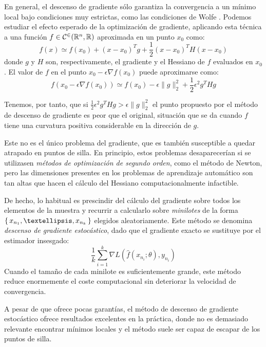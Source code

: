 En general, el descenso de gradiente sólo garantiza la convergencia a un mínimo local bajo condiciones muy estrictas, como las condiciones de Wolfe \cite{nocedal2006}. Podemos estudiar el efecto esperado de la optimización de gradiente, aplicando esta técnica a una función \( f \in \mathcal{C^2}(\mathbb{R}^{n}, \mathbb{R}) \) aproximada en un punto \( x_{0} \) como:
\[
    f(x) \simeq f(x_{0}) + (x - x_{0})^T g + \frac{1}{2} (x - x_{0})^T H (x-x_{0})
\]
donde \( g \) y \( H \) son, respectivamente, el gradiente y  el Hessiano de \( f \) evaluados en \( x_{0} \). El valor de \( f \) en el punto \( x_{0} - \epsilon \nabla f(x_0) \) puede aproximarse como:
\begin{equation}\label{eq:descent}
    f \left( x_{0} - \epsilon \nabla f(x_{0}) \right) \simeq f(x_{0}) - \epsilon \| g \|_2^2 +  \frac{1}{2} \epsilon^2 g^T Hg
\end{equation}

Tenemos, por tanto, que si \( \frac{1}{2} \epsilon^2 g^T Hg > \epsilon \| g \|_2^2 \) el punto propuesto por el método de descenso de gradiente es peor que el original, situación que se da cuando \( f \) tiene una curvatura positiva considerable en la dirección de \( g \). 

Este no es el único problema del gradiente, que es también susceptible a quedar atrapado en puntos de silla. En principio, estos problemas desaparecerían si se utilizasen \textit{métodos de optimización de segundo orden}, como el método de Newton, pero las dimensiones presentes en los problemas de aprendizaje automático son tan altas que hacen el cálculo del Hessiano computacionalmente infactible.

De hecho, lo habitual es prescindir del cálculo del gradiente sobre todos los elementos de la muestra y recurrir a calcularlo sobre \textit{minilotes} de la forma \( \Set{ x_{n_1}, …, x_{n_k} } \) elegidos aleatoriamente. Este método se denomina \textit{descenso de gradiente estocástico}, dado que el gradiente exacto se sustituye por el estimador insesgado: \[
    \frac{1}{k} \sum_{i = 1}^k \nabla L\left( \widehat{f}(x_{n_i}; \theta), y_{n_i} \right) 
\]
Cuando el tamaño de cada minilote es suficientemente grande, este método reduce enormemente el coste computacional sin deteriorar la velocidad de convergencia.

A pesar de que ofrece pocas garantías, el método de descenso de gradiente estocástico ofrece resultados excelentes en la práctica, donde no es demasiado relevante encontrar mínimos locales y el método suele ser capaz de escapar de los puntos de silla. 

